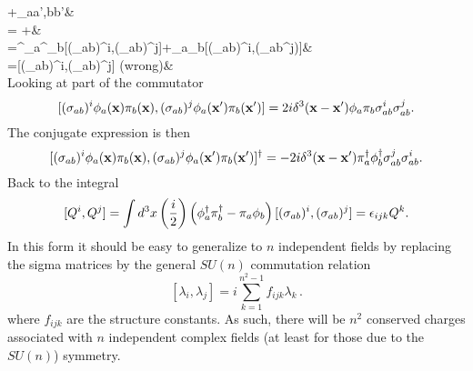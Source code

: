 \documentclass[10pt,letterpaper]{article}
\begin{document}
		+\delta_{aa',bb'}&\\
		=
		+&\\
		=\phi^\dag_a\pi^\dag_b[(\sigma_{ab})^i,(\sigma_{ab})^j]+\pi_a\phi_b[(\sigma_{ab})^i,(\sigma_{ab}^j)]&\\
		=[(\sigma_{ab})^i,(\sigma_{ab})^j] (wrong)&
	\ea
	\\ 
	Looking at part of the commutator
	\[
		[(\sigma_{ab})^i\phi_a(\mathbf{x})\pi_b(\mathbf{x}),(\sigma_{ab})^j\phi_a(\mathbf{x}')\pi_b(\mathbf{x}')]
		=2i\delta^3(\mathbf{x}-\mathbf{x}')\phi_a\pi_b\sigma_{ab}^i\sigma_{ab}^j.
	\]
	The conjugate expression is then
	\[
		[(\sigma_{ab})^i\phi_a(\mathbf{x})\pi_b(\mathbf{x}),(\sigma_{ab})^j\phi_a(\mathbf{x}')\pi_b(\mathbf{x}')]^\dag
		=-2i\delta^3(\mathbf{x}-\mathbf{x}')\pi_a^\dag\phi_b^\dag\sigma_{ab}^j\sigma_{ab}^i.
	\]	
	Back to the integral
	\[
		[Q^i,Q^j] = \int d^3x \left(\frac{i}{2}\right) \left( \phi_a^\dag\pi_b^\dag-\pi_a\phi_b\right)[(\sigma_{ab})^i,(\sigma_{ab})^j] = 
		\epsilon_{ijk}Q^k.
	\]
	In this form it should be easy to generalize to $n$ independent fields by replacing the sigma matrices
	by the general $SU(n)$ commutation relation
	\[
	 	\left[\lambda_i, \lambda_j \right] = i \sum_{k=1}^{n^2 -1}{f_{ijk} \lambda_k} \,    .
	\]
	where $f_{ijk}$ are the structure constants. As such, there will be $n^2$ conserved charges associated with $n$
	independent complex fields (at least for those due to the $SU(n)$) symmetry. 
	\eenum
	\eenum
\end{document}
